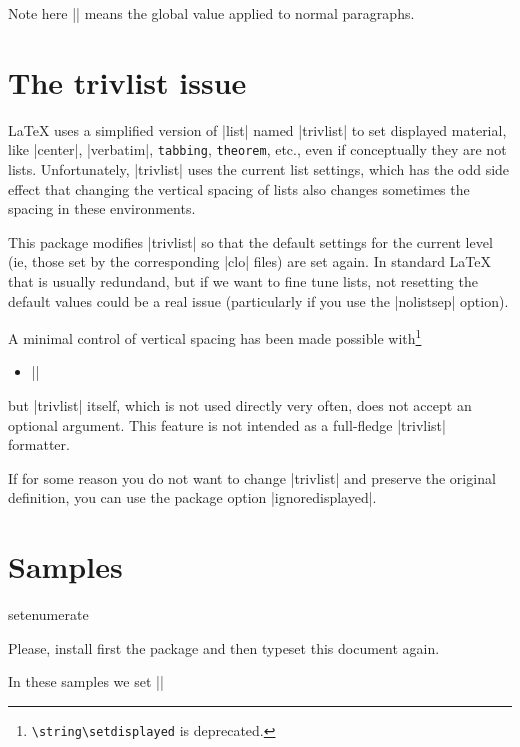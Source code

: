 \documentclass[a4paper]{ltxguide}
\newcommand\3{\unskip\enspace\fbox{\fontsize{4}{4}\selectfont NEW 3.0}}
\begin{document}
Note here |\parindent| means the global value applied
to normal paragraphs.

\section{The trivlist issue}

\LaTeX{} uses a simplified version of |list| named |trivlist| to set
displayed material, like |center|, |verbatim|, \verb|tabbing|,
\verb|theorem|, etc., even if conceptually they are not lists.
Unfortunately, |trivlist| uses the current list settings, which has
the odd side effect that changing the vertical spacing of lists also
changes sometimes the spacing in these environments.

This package modifies |trivlist| so that the default settings for 
the current level (ie, those set by the corresponding |clo| 
files) are set again. In standard \LaTeX{} that is usually redundand, 
but if we want to fine tune lists, not resetting the default values 
could be a real issue (particularly if you use the |nolistsep| 
option).

A minimal control of vertical spacing has been made possible 
with\footnote{\verb|\string\setdisplayed| is deprecated.}
\begin{itemize}
\item ||
\end{itemize}
but |trivlist| itself, which is not used directly very
often, does not accept an optional argument. This feature
is not intended as a full-fledge |trivlist| formatter.

If for some reason you do not want to change |trivlist|
and preserve the original definition, you can use the
package option |ignoredisplayed|.

\section{Samples}

\expandafter\ifx\csname setenumerate\endcsname\relax

Please, install first the package and then typeset this
document again.

\else

In these samples we set ||

\small

\newcommand{\newsample}{\vskip6pt\goodbreak\hrule height 1pt\vskip6pt}
\newcommand{\samplesep}{\vskip6pt\goodbreak\hrule\vskip6pt}
\newbox\vsep
\setbox\vsep\hbox{\vrule height 2ex depth 16ex width 1pt}
\dp{}
\newcommand\showsep{\leavevmode\llap{\copy\vsep}}
\end{document}

